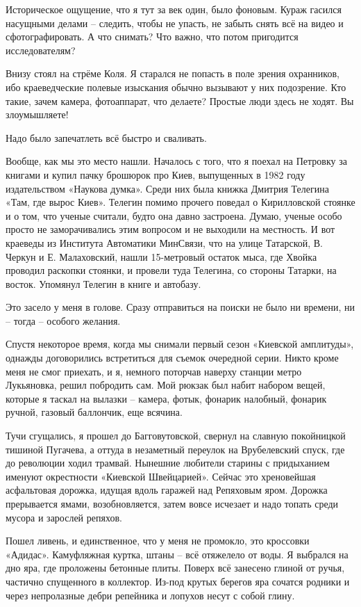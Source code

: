 Историческое ощущение, что я тут за век один, было фоновым. Кураж гасился насущными делами – следить, чтобы не упасть, не забыть снять всё на видео и сфотографировать. А что снимать? Что важно, что потом пригодится исследователям?

Внизу стоял на стрёме Коля. Я старался не попасть в поле зрения охранников, ибо краеведческие полевые изыскания обычно вызывают у них подозрение. Кто такие, зачем камера, фотоаппарат, что делаете? Простые люди здесь не ходят. Вы злоумышляете!

Надо было запечатлеть всё быстро и сваливать.

Вообще, как мы это место нашли. Началось с того, что я поехал на Петровку за книгами и купил пачку брошюрок про Киев, выпущенных в 1982 году издательством «Наукова думка». Среди них была книжка Дмитрия Телегина «Там, где вырос Киев». Телегин помимо прочего поведал о Кирилловской стоянке и о том, что ученые считали, будто она давно застроена. Думаю, ученые особо просто не заморачивались этим вопросом и не выходили на местность. И вот краеведы из Института Автоматики МинСвязи, что на улице Татарской, В. Черкун и Е. Малаховский, нашли 15-метровый остаток мыса, где Хвойка проводил раскопки стоянки, и провели туда Телегина, со стороны Татарки, на восток. Упомянул Телегин в книге и автобазу.

Это засело у меня в голове. Сразу отправиться на поиски не было ни времени, ни – тогда – особого желания.

Спустя некоторое время, когда мы снимали первый сезон «Киевской амплитуды», однажды договорились встретиться для съемок очередной серии. Никто кроме меня не смог приехать, и я, немного поторчав наверху станции метро Лукьяновка, решил побродить сам. Мой рюкзак был набит набором вещей, которые я таскал на вылазки – камера, фотык, фонарик налобный, фонарик ручной, газовый баллончик, еще всячина.

Тучи сгущались, я прошел до Багговутовской, свернул на славную покойницкой тишиной Пугачева, а оттуда в незаметный переулок на Врубелевский спуск, где до революции ходил трамвай. Нынешние любители старины с придыханием именуют окрестности «Киевской Швейцарией». Сейчас это хреновейшая асфальтовая дорожка, идущая вдоль гаражей над Репяховым яром. Дорожка прерывается ямами, возобновляется, затем вовсе исчезает и надо топать среди мусора и зарослей репяхов.

Пошел ливень, и единственное, что у меня не промокло, это кроссовки «Адидас». Камуфляжная куртка, штаны – всё отяжелело от воды. Я выбрался на дно яра, где проложены бетонные плиты. Поверх всё занесено глиной от ручья, частично спущенного в коллектор. Из-под крутых берегов яра сочатся родники и через непролазные дебри репейника и лопухов несут с собой глину.

